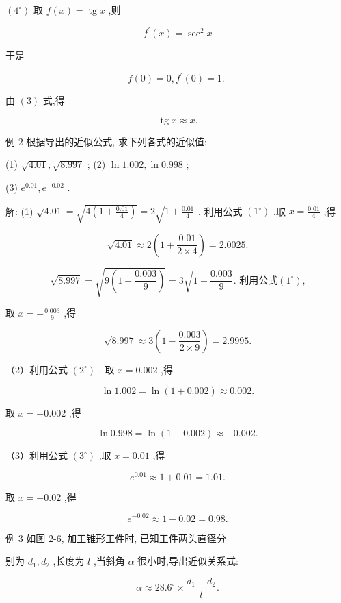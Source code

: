 \documentclass[lang=cn,newtx,12pt,scheme=chinese]{elegantbook}
\begin{document}
\(\left( {4}^{ \circ }\right)\) 取 \(f\left( x\right) = \operatorname{tg}x\) ,则

\[
{f}^{\prime }\left( x\right) = {\sec }^{2}x
\]

于是

\[
f\left( 0\right) = 0,{f}^{\prime }\left( 0\right) = 1\text{. }
\]

由 \(\left( 3\right)\) 式,得

\[
\operatorname{tg}x \approx x\text{.}
\]

例 2 根据导出的近似公式, 求下列各式的近似值:

(1) \(\sqrt{4.01},\sqrt{8.997}\) ; (2) \(\ln {1.002},\ln {0.998}\) ;

(3) \({e}^{0.01},{e}^{-{0.02}}\) .

解: (1) \(\sqrt{4.01} = \sqrt{4\left( {1 + \frac{0.01}{4}}\right) } = 2\sqrt{1 + \frac{0.01}{4}}\) . 利用公式 \(\left( {1}^{ \circ }\right)\) ,取 \(x = \frac{0.01}{4}\) ,得

\[
\sqrt{4.01} \approx 2\left( {1 + \frac{0.01}{2 \times 4}}\right) = {2.0025}.
\]

\[
\sqrt{8.997} = \sqrt{9\left( {1 - \frac{0.003}{9}}\right) } = 3\sqrt{1 - \frac{0.003}{9}}\text{. 利用公式}\left( {1}^{ \circ }\right) \text{,}
\]

取 \(x = - \frac{0.003}{9}\) ,得

\[
\sqrt{8.997} \approx 3\left( {1 - \frac{0.003}{2 \times 9}}\right) = {2.9995}.
\]

（2）利用公式 \(\left( {2}^{ \circ }\right)\) . 取 \(x = {0.002}\) ,得

\[
\ln {1.002} = \ln \left( {1 + {0.002}}\right) \approx {0.002}\text{.}
\]

取 \(x = - {0.002}\) ,得

\[
\ln {0.998} = \ln \left( {1 - {0.002}}\right) \approx - {0.002}.
\]

（3）利用公式 \(\left( {3}^{ \circ }\right)\) ,取 \(x = {0.01}\) ,得

\[
{e}^{0.01} \approx 1 + {0.01} = {1.01}.
\]

取 \(x = - {0.02}\) ,得

\[
{e}^{-{0.02}} \approx 1 - {0.02} = {0.98}.
\]

例 3 如图 2-6, 加工锥形工件时, 已知工件两头直径分

别为 \({d}_{1},{d}_{2}\) ,长度为 \(l\) ,当斜角 \(\alpha\) 很小时,导出近似关系式:

\[
\alpha \approx {28.6}^{ \circ } \times \frac{{d}_{1} - {d}_{2}}{l}.
\]
\end{document}
